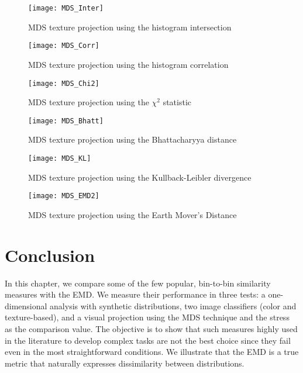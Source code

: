 \begin{figure}[!ht]
 \centering    
 \texttt{[image: MDS\_Inter]}
 \caption{MDS texture projection using the histogram intersection}
 \label{fig:MDS_Inter} 
\end{figure}

\begin{figure}[!ht]
 \centering    
 \texttt{[image: MDS\_Corr]}
 \caption{MDS texture projection using the histogram correlation}
 \label{fig:MDS_Corr} 
\end{figure}

\begin{figure}[!ht]
 \centering    
 \texttt{[image: MDS\_Chi2]}
 \caption{MDS texture projection using the $\chi^2$ statistic}
 \label{fig:MDS_Chi2} 
\end{figure}

\begin{figure}[!ht]
 \centering    
 \texttt{[image: MDS\_Bhatt]}
 \caption{MDS texture projection using the Bhattacharyya distance}
 \label{fig:MDS_Bhatt} 
\end{figure}

\begin{figure}[!ht]
 \centering    
 \texttt{[image: MDS\_KL]}
 \caption{MDS texture projection using the Kullback-Leibler divergence}
 \label{fig:MDS_KL} 
\end{figure}

\begin{figure}[!ht]
 \centering    
 \texttt{[image: MDS\_EMD2]}
 \caption{MDS texture projection using the Earth Mover's Distance}
 \label{fig:MDS_EMD} 
\end{figure}

\section{Conclusion}\label{sec:conclusions}

In this chapter, we compare some of the few popular, bin-to-bin similarity measures with the EMD. We measure their performance in three tests: a one-dimensional analysis with synthetic distributions, two image classifiers (color and texture-based), and a visual projection using the MDS technique and the stress as the comparison value. The objective is to show that such measures highly used in the literature to develop complex tasks are not the best choice since they fail even in the most straightforward conditions. We illustrate that the EMD is a true metric \citep{Peyre.Cuturi:arXiv:2018} that naturally expresses dissimilarity between distributions.

